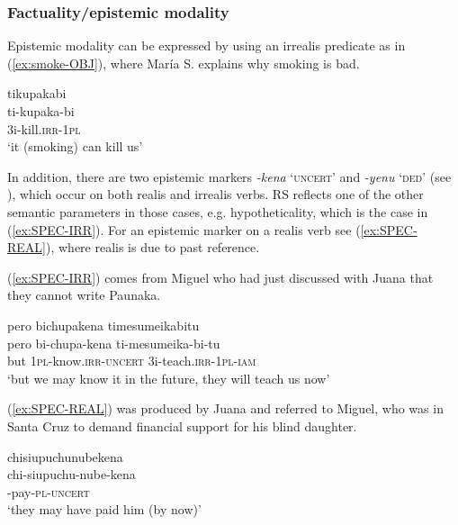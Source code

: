 \subsubsection{Factuality/epistemic modality}\label{par:IRR-factuality_epistemic_modality}

Epistemic modality can be expressed by using an irrealis predicate as in (\ref{ex:smoke-OBJ}), where María S. explains why smoking is bad.

\ea\label{ex:smoke-OBJ}
\begingl
\glpreamble tikupakabi\\
\gla ti-kupaka-bi\\
\glb 3i-kill.\textsc{irr}-1\textsc{pl}\\
\glft ‘it (smoking) can kill us’
\endgl
 \trailingcitation{[rxx-e120511l.385]}
\xe
{}

In addition, there are two epistemic markers  \textit{-kena} ‘\textsc{uncert}’ and \textit{-yenu} ‘\textsc{ded}’ (see ), which occur on both realis and irrealis verbs. RS reflects one of the other semantic parameters in those cases, e.g. hypotheticality, which is the case in (\ref{ex:SPEC-IRR}). For an epistemic marker on a realis verb see (\ref{ex:SPEC-REAL}), where realis is due to past reference.

(\ref{ex:SPEC-IRR}) comes from Miguel who had just discussed with Juana that they cannot write Paunaka.

\ea\label{ex:SPEC-IRR}
\begingl 
\glpreamble pero bichupakena timesumeikabitu \\
\gla pero bi-chupa-kena ti-mesumeika-bi-tu\\ 
\glb but 1\textsc{pl}-know.\textsc{irr}-\textsc{uncert} 3i-teach.\textsc{irr}-1\textsc{pl}-\textsc{iam}\\ 
\glft ‘but we may know it in the future, they will teach us now’
 \trailingcitation{[jmx-e090727s.031]}
\xe

(\ref{ex:SPEC-REAL}) was produced by Juana and referred to Miguel, who was in Santa Cruz to demand financial support for his blind daughter.

\ea\label{ex:SPEC-REAL}
\begingl 
\glpreamble chisiupuchunubekena\\
\gla chi-siupuchu-nube-kena\\ 
-pay-\textsc{pl}-\textsc{uncert}\\ 
\glft ‘they may have paid him (by now)’
 \trailingcitation{[jxx-p120430l-1.084]}
\xe



